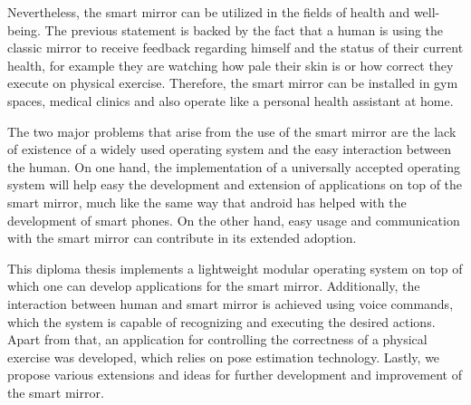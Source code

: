 Nevertheless, the smart mirror can be utilized in the fields of health and well-being. The previous statement is backed by the fact that a human is using the classic mirror to receive feedback regarding himself and the status of their current health, for example they are watching how pale their skin is or how correct they execute on physical exercise. Therefore, the smart mirror can be installed in gym spaces, medical clinics and also operate like a personal health assistant at home.

The two major problems that arise from the use of the smart mirror are the lack of existence of a widely used operating system and the easy interaction between the human. On one hand, the implementation of a universally accepted operating system will help easy the development and extension of applications on top of the smart mirror, much like the same way that android has helped with the development of smart phones. On the other hand, easy usage and communication with the smart mirror can contribute in its extended adoption.

This diploma thesis implements a lightweight modular operating system on top of which one can develop applications for the smart mirror. Additionally, the interaction between human and smart mirror is achieved using voice commands, which the system is capable of recognizing and executing the desired actions. Apart from that, an application for controlling the correctness of a physical exercise was developed, which relies on pose estimation technology. Lastly, we propose various extensions and ideas for further development and improvement of the smart mirror.